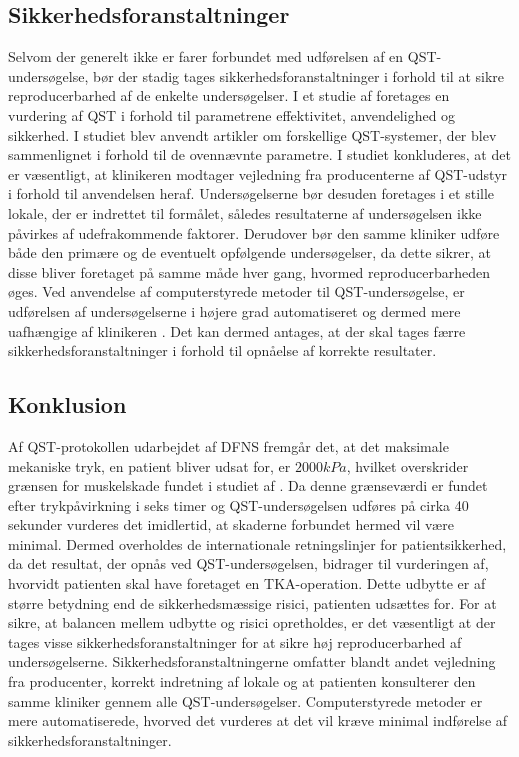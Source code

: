 \subsection{Sikkerhedsforanstaltninger}
Selvom der generelt ikke er farer forbundet med udførelsen af en QST-undersøgelse, bør der stadig tages sikkerhedsforanstaltninger i forhold til at sikre reproducerbarhed af de enkelte undersøgelser. I et studie af  foretages en vurdering af QST i forhold til parametrene effektivitet, anvendelighed og sikkerhed. I studiet blev anvendt artikler om forskellige QST-systemer, der blev sammenlignet i forhold til de ovennævnte parametre. I studiet konkluderes, at det er væsentligt, at klinikeren modtager vejledning fra producenterne af QST-udstyr i forhold til anvendelsen heraf. Undersøgelserne bør desuden foretages i et stille lokale, der er indrettet til formålet, således resultaterne af undersøgelsen ikke påvirkes af udefrakommende faktorer. Derudover bør den samme kliniker udføre både den primære og de eventuelt opfølgende undersøgelser, da dette sikrer, at disse bliver foretaget på samme måde hver gang, hvormed reproducerbarheden øges. \citep{shy2003}
Ved anvendelse af computerstyrede metoder til QST-undersøgelse, er udførelsen af undersøgelserne i højere grad automatiseret og dermed mere uafhængige af klinikeren \citep{Nielsen2015}. Det kan dermed antages, at der skal tages færre sikkerhedsforanstaltninger i forhold til opnåelse af korrekte resultater.  


\subsection{Konklusion}
Af QST-protokollen udarbejdet af DFNS fremgår det, at det maksimale mekaniske tryk, en patient bliver udsat for, er $2000 kPa$, hvilket overskrider grænsen for muskelskade fundet i studiet af . Da denne grænseværdi er fundet efter trykpåvirkning i seks timer og QST-undersøgelsen udføres på cirka 40 sekunder vurderes det imidlertid, at skaderne forbundet hermed vil være minimal. Dermed overholdes de internationale retningslinjer for patientsikkerhed, da det resultat, der opnås ved QST-undersøgelsen, bidrager til vurderingen af, hvorvidt patienten skal have foretaget en TKA-operation. Dette udbytte er af større betydning end de sikkerhedsmæssige risici, patienten udsættes for.
For at sikre, at balancen mellem udbytte og risici opretholdes, er det væsentligt at der tages visse sikkerhedsforanstaltninger for at sikre høj reproducerbarhed af undersøgelserne. Sikkerhedsforanstaltningerne omfatter blandt andet vejledning fra producenter, korrekt indretning af lokale og at patienten konsulterer den samme kliniker gennem alle QST-undersøgelser. Computerstyrede metoder er mere automatiserede, hvorved det vurderes at det vil kræve minimal indførelse af sikkerhedsforanstaltninger.


